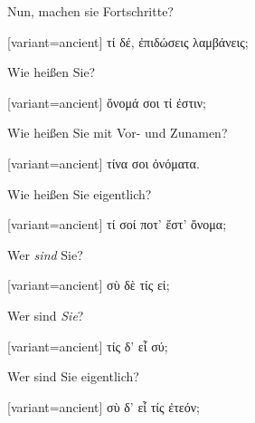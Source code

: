 Nun, machen sie Fort\textcompwordmark{}schritte?

\switchcolumn

\begin{greek}[variant=ancient]%
τί δέ, ἐπιδώσεις λαμβάνεις;

\end{greek}%
\indent Wie heißen Sie?

\switchcolumn

\begin{greek}[variant=ancient]%
ὄνομά σοι τί ἐστιν;

\end{greek}%
\switchcolumn*

Wie heißen Sie mit Vor- und Zunamen?

\switchcolumn

\begin{greek}[variant=ancient]%
τίνα σοι ὀνόματα.

\end{greek}%
\switchcolumn*

Wie heißen Sie eigentlich?

\switchcolumn

\begin{greek}[variant=ancient]%
τί σοί ποτ' ἔστ' ὄνομα;

\end{greek}%
\switchcolumn*

Wer \emph{sind} Sie?

\switchcolumn

\begin{greek}[variant=ancient]%
σὺ δὲ τίς εἰ;

\end{greek}%
\switchcolumn*

Wer sind \emph{Sie}?

\switchcolumn

\begin{greek}[variant=ancient]%
τίς δ' εἶ σύ;

\end{greek}%
\switchcolumn*

Wer sind Sie eigentlich?

\switchcolumn

\begin{greek}[variant=ancient]%
σὺ δ' εἶ τίς ἐτεόν;

\end{greek}%
\switchcolumn*

